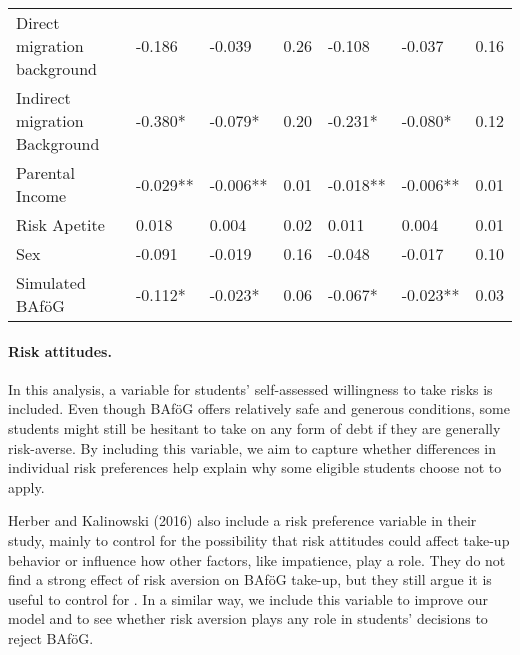\begin{table}[htbp]
\begin{tabular}{lllllll}
Direct migration background         & -0.186    & -0.039     & 0.26     & -0.108    & -0.037     & 0.16     \\
Indirect migration Background       & -0.380*   & -0.079*    & 0.20     & -0.231*   & -0.080*    & 0.12     \\
Parental Income                     & -0.029**  & -0.006**   & 0.01     & -0.018**  & -0.006**   & 0.01     \\
Risk Apetite                        & 0.018     & 0.004      & 0.02     & 0.011     & 0.004      & 0.01     \\
Sex                                 & -0.091    & -0.019     & 0.16     & -0.048    & -0.017     & 0.10     \\
Simulated BAföG                     & -0.112*   & -0.023*    & 0.06     & -0.067*   & -0.023**   & 0.03     \\
\bottomrule
\end{tabular}
\end{table}


\paragraph{Risk attitudes.} In this analysis, a variable for students' self-assessed willingness to take risks is included. Even though BAföG offers relatively safe and generous conditions, some students might still be hesitant to take on any form of debt if they are generally risk-averse. By including this variable, we aim to capture whether differences in individual risk preferences help explain why some eligible students choose not to apply.

Herber and Kalinowski (2016) also include a risk preference variable in their study, mainly to control for the possibility that risk attitudes could affect take-up behavior or influence how other factors, like impatience, play a role. They do not find a strong effect of risk aversion on BAföG take-up, but they still argue it is useful to control for \citep{herber_non-take-up_2019}. In a similar way, we include this variable to improve our model and to see whether risk aversion plays any role in students’ decisions to reject BAföG.


